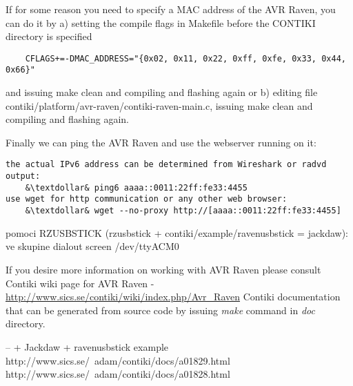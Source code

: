 \documentclass{article}
\begin{document}
If for some reason you need to specify a MAC address of the AVR Raven, you can do it by
a) setting the compile flags in Makefile before the CONTIKI directory is specified
\begin{lstlisting}
	CFLAGS+=-DMAC_ADDRESS="{0x02, 0x11, 0x22, 0xff, 0xfe, 0x33, 0x44, 0x66}"
\end{lstlisting}
and issuing make clean and compiling and flashing again
or
b) editing file contiki/platform/avr-raven/contiki-raven-main.c,
issuing make clean and compiling and flashing again.


Finally we can ping the AVR Raven and use the webserver running on it:
\begin{lstlisting}
the actual IPv6 address can be determined from Wireshark or radvd output:
	&\textdollar& ping6 aaaa::0011:22ff:fe33:4455
use wget for http communication or any other web browser:
	&\textdollar& wget --no-proxy http://[aaaa::0011:22ff:fe33:4455]
\end{lstlisting}



pomoci RZUSBSTICK (rzusbstick + contiki/example/ravenusbstick = jackdaw):
ve skupine dialout
screen /dev/ttyACM0



If you desire more information on working with AVR Raven please consult
Contiki wiki page for AVR Raven - \url{http://www.sics.se/contiki/wiki/index.php/Avr_Raven}
Contiki documentation that can be generated from source code
by issuing {\it{make}} command in {\it{doc}} directory.

-- + Jackdaw + ravenusbstick example
http://www.sics.se/~adam/contiki/docs/a01829.html
http://www.sics.se/~adam/contiki/docs/a01828.html
\end{document}
